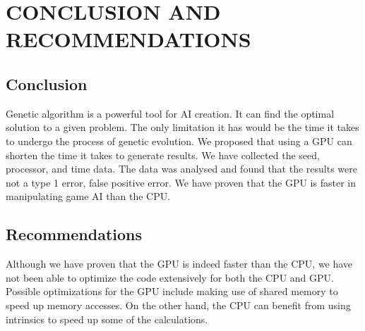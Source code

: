 \chapter{CONCLUSION AND RECOMMENDATIONS}

\section{Conclusion}
Genetic algorithm is a powerful tool for AI creation. It can find the optimal
solution to a given problem. The only limitation it has would be the time it 
takes to undergo the process of genetic evolution. We proposed that using a
GPU can shorten the time it takes to generate results. We have collected the
seed, processor, and time data. The data was analysed and found that the results
were not a type 1 error, false positive error. We have proven that the GPU is faster
in manipulating game AI than the CPU.

\section{Recommendations}
Although we have proven that the GPU is indeed faster than the CPU, we have not
been able to optimize the code extensively for both the CPU and GPU. Possible 
optimizations for the GPU include making use of shared memory to speed up memory
accesses. On the other hand, the CPU can benefit from using intrinsics to speed
up some of the calculations.

  